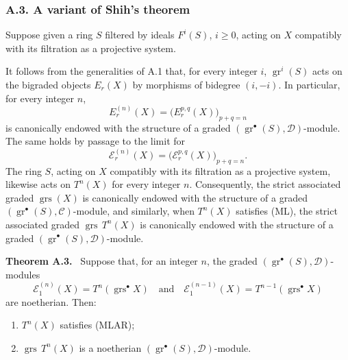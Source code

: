 \documentclass[11pt]{article}
\newenvironment{statement}[1]{\par\medskip\noindent\textbf{#1.}\ }{\par\medskip}
\providecommand{\gr}{\operatorname{gr}}
\providecommand{\gr}{\operatorname{gr}}
\providecommand{\gr}{\operatorname{gr}}
\providecommand{\grs}{\operatorname{grs}}
\begin{document}
\subsubsection*{A.3. A variant of Shih's theorem}\label{sga5:V:subsubsection:a.3}
Suppose given a ring \(S\) filtered by ideals \(F^i(S)\), \(i\ge0\), acting on \(X\) compatibly with its filtration as a projective system.

It follows from the generalities of A.1 that, for every integer \(i\), \(\gr^i(S)\) acts on the bigraded objects \(E_r(X)\) by morphisms of bidegree \((i,-i)\). In particular, for every integer \(n\),
\[
E_r^{(n)}(X)=\bigl(E_r^{p,q}(X)\bigr)_{p+q=n}
\]
is canonically endowed with the structure of a graded \((\gr^\bullet(S),\mathcal D)\)-module. The same holds by passage to the limit for
\[
\mathcal E_r^{(n)}(X)=\bigl(\mathcal E_r^{p,q}(X)\bigr)_{p+q=n}.
\]
The ring \(S\), acting on \(X\) compatibly with its filtration as a projective system, likewise acts on \(T^n(X)\) for every integer \(n\). Consequently, the strict associated graded \(\grs(X)\) is canonically endowed with the structure of a graded \((\gr^\bullet(S),\mathcal C)\)-module, and similarly, when \(T^n(X)\) satisfies (ML), the strict associated graded \(\grs\,T^n(X)\) is canonically endowed with the structure of a graded \((\gr^\bullet(S),\mathcal D)\)-module.

\label{sga5:V:theorem:a.3}\begin{statement}{Theorem A.3}
Suppose that, for an integer \(n\), the graded \((\gr^\bullet(S),\mathcal D)\)-modules
\[
\mathcal E_1^{(n)}(X)=T^n(\grs^\bullet X)
\quad\text{and}\quad
\mathcal E_1^{(n-1)}(X)=T^{n-1}(\grs^\bullet X)
\]
are noetherian. Then:
\begin{enumerate}[label=\textup{(\roman*)}]
\item \(T^n(X)\) satisfies (MLAR);
\item \(\grs\,T^n(X)\) is a noetherian \((\gr^\bullet(S),\mathcal D)\)-module.
\end{enumerate}
\end{statement}
\end{document}
